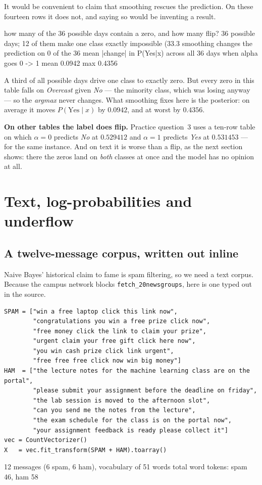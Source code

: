 \documentclass[11pt]{article}
\begin{document}
It would be convenient to claim that smoothing rescues the prediction. On
these fourteen rows it does not, and saying so would be inventing a result.

\begin{codeout}
how many of the 36 possible days contain a zero, and how many flip?
   36 possible days; 12 of them make one class exactly impossible (33.3%
   smoothing changes the prediction on 0 of the 36
mean |change| in P(Yes|x) across all 36 days when alpha goes 0 -> 1
   mean 0.0942   max 0.4356
\end{codeout}

A third of all possible days drive one class to exactly zero. But every zero
in this table falls on \emph{Overcast} given \emph{No} --- the minority class,
which was losing anyway --- so the \emph{argmax} never changes. What
smoothing fixes here is the posterior: on average it moves
$P(\text{Yes} \mid x)$ by $0.0942$, and at worst by $0.4356$.

\textbf{On other tables the label does flip.} Practice question~3 uses a
ten-row table on which $\alpha = 0$ predicts \emph{No} at $0.529412$ and
$\alpha = 1$ predicts \emph{Yes} at $0.531453$ --- for the same instance. And
on text it is worse than a flip, as the next section shows: there the zeros
land on \emph{both} classes at once and the model has no opinion at all.

\section{Text, log-probabilities and underflow}
\label{sec:logs}

\subsection{A twelve-message corpus, written out inline}

Naive Bayes' historical claim to fame is spam filtering, so we need a text
corpus. Because the campus network blocks
\texttt{fetch\_20newsgroups}, here is one typed out in the source.

\begin{lstlisting}
SPAM = ["win a free laptop click this link now",
        "congratulations you win a free prize click now",
        "free money click the link to claim your prize",
        "urgent claim your free gift click here now",
        "you win cash prize click link urgent",
        "free free free click now win big money"]
HAM  = ["the lecture notes for the machine learning class are on the portal",
        "please submit your assignment before the deadline on friday",
        "the lab session is moved to the afternoon slot",
        "can you send me the notes from the lecture",
        "the exam schedule for the class is on the portal now",
        "your assignment feedback is ready please collect it"]
vec = CountVectorizer()
X   = vec.fit_transform(SPAM + HAM).toarray()
\end{lstlisting}
\begin{codeout}
12 messages (6 spam, 6 ham), vocabulary of 51 words
total word tokens: spam 46, ham 58
\end{codeout}
\end{document}
